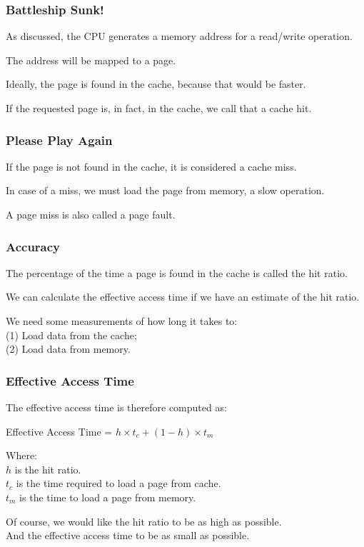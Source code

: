 \begin{frame}
\frametitle{Battleship Sunk!}

As discussed, the CPU generates a memory address for a read/write operation. 

The address will be mapped to a page. 

Ideally, the page is found in the cache, because that would be faster. 

If the requested page is, in fact,  in the cache, we call that a cache \alert{hit}.

\end{frame}

\begin{frame}
\frametitle{Please Play Again}

If the page is not found in the cache, it is considered a cache \alert{miss}. 

In case of a miss, we must load the page from memory, a slow operation. 

A page miss is also called a \alert{page fault}.

\end{frame}

\begin{frame}
\frametitle{Accuracy}

The percentage of the time  a page is found in the cache is called the \alert{hit ratio}.

We can calculate the effective access time if we have an estimate of the hit ratio.

We need some measurements of how long it takes to:\\
\quad (1) Load data from the cache;\\
\quad (2) Load data from memory. 

\end{frame}

\begin{frame}
\frametitle{Effective Access Time}

The effective access time is therefore computed as:

\begin{center}
Effective Access Time = $h \times t_{c} + (1-h) \times t_{m}$
\end{center}

Where:\\
\quad $h$ is the hit ratio.\\
\quad $t_{c}$ is the time required to load a page from cache.\\
\quad $t_{m}$ is the time to load a page from memory. 


Of course, we would like the hit ratio to be as high as possible.\\
\quad And the effective access time to be as small as possible.

\end{frame}


